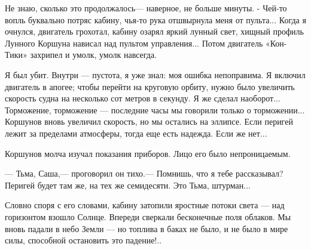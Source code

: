 \documentclass[11pt,a4paper,oneside]{article}
\begin{document}
Не знаю, сколько это продолжалось— наверное, не больше минуты. - Чей-то вопль буквально потряс кабину, чья-то рука отшвырнула меня от пульта... Когда я очнулся, двигатель грохотал, кабину озарял яркий лунный свет, хищный профиль Лунного Коршуна нависал над пультом управления... Потом двигатель «Кон-Тики» захрипел и умолк, умолк навсегда.

Я был убит. Внутри — пустота, я уже знал: моя ошибка непоправима. Я включил двигатель в апогее; чтобы перейти на круговую орбиту, нужно было увеличить скорость судна на несколько сот метров в секунду. Я же сделал наоборот... Торможение, торможение — последние часы мы говорили только о торможении... Коршунов вновь увеличил скорость, но мы остались на эллипсе. Если перигей лежит за пределами атмосферы, тогда еще есть надежда. Если же нет...

Коршунов молча изучал показания приборов. Лицо его было непроницаемым.

— Тьма, Саша,— проговорил он тихо.— Помнишь, что я тебе рассказывал? Перигей будет там же, на тех же семидесяти. Это Тьма, штурман...

Словно споря с его словами, кабину затопили яростные потоки света — над горизонтом взошло Солнце. Впереди сверкали бесконечные поля облаков. Мы вновь падали в небо Земли — но топлива в баках не было, и не было в мире силы, способной остановить это падение!..
\end{document}
